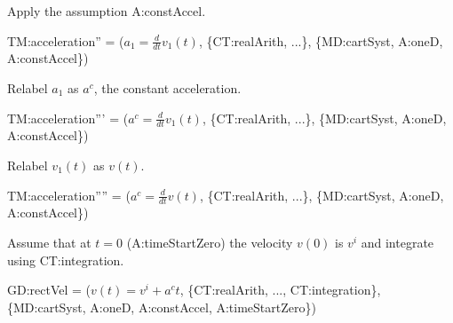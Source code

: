\documentclass{article}
\begin{document}
\noindent Apply the assumption A:constAccel.

TM:acceleration'' = ($a_1 = \frac{d}{dt} v_1(t)$, \{CT:realArith,
...\}, \{MD:cartSyst, A:oneD, A:constAccel\})

\noindent Relabel $a_1$ as $a^c$, the constant acceleration.

TM:acceleration''' = ($a^c = \frac{d}{dt} v_1(t)$, \{CT:realArith,
...\}, \{MD:cartSyst, A:oneD, A:constAccel\})

\noindent Relabel $v_1(t)$ as $v(t)$.

TM:acceleration'''' = ($a^c = \frac{d}{dt} v(t)$, \{CT:realArith,
...\}, \{MD:cartSyst, A:oneD, A:constAccel\})

\noindent Assume that at $t = 0$ (A:timeStartZero) the velocity $v(0)$ is $v^i$
and integrate using CT:integration.

GD:rectVel = ($v(t) = v^i + a^c t$, \{CT:realArith, ...,
CT:integration\}, \{MD:cartSyst, A:oneD, A:constAccel, A:timeStartZero\})
\end{document}
